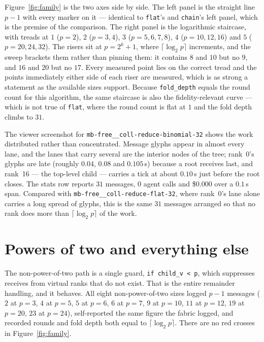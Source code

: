 \documentclass[11pt]{article}
\begin{document}
Figure~\ref{fig:family} is the two axes side by side. The left panel is the straight line $p-1$
with every marker on it --- identical to \texttt{flat}'s and \texttt{chain}'s left panel, which
is the premise of the comparison. The right panel is the logarithmic staircase, with treads at
$1$ ($p=2$), $2$ ($p=3,4$), $3$ ($p=5,6,7,8$), $4$ ($p=10,12,16$) and $5$ ($p=20,24,32$). The
risers sit at $p=2^k+1$, where $\lceil\log_2 p\rceil$ increments, and the sweep brackets them
rather than pinning them: it contains $8$ and $10$ but no $9$, and $16$ and $20$ but no $17$.
Every measured point lies on the correct tread and the points immediately either side of each
riser are measured, which is as strong a statement as the available sizes support. Because
\texttt{fold\_depth} equals the round count for this algorithm, the same staircase is also the
fidelity-relevant curve --- which is not true of \texttt{flat}, where the round count is flat at
$1$ and the fold depth climbs to $31$.

The viewer screenshot for \texttt{mb-free\_\_coll-reduce-binomial-32} shows the work
distributed rather than concentrated. Message glyphs appear in almost every lane, and the lanes
that carry several are the interior nodes of the tree; rank~0's glyphs are late (roughly $0.04$,
$0.08$ and $0.105$\,s) because a root receives last, and rank~16 --- the top-level child ---
carries a tick at about $0.10$\,s just before the root closes. The stats row reports $31$
messages, $0$ agent calls and \$0.000 over a $0.1$\,s span. Compared with
\texttt{mb-free\_\_coll-reduce-flat-32}, where rank~0's lane alone carries a long spread of
glyphs, this is the same $31$ messages arranged so that no rank does more than
$\lceil\log_2 p\rceil$ of the work.

\section{Powers of two and everything else}

The non-power-of-two path is a single guard, \texttt{if child\_v < p}, which suppresses receives
from virtual ranks that do not exist. That is the entire remainder handling, and it behaves. All
eight non-power-of-two sizes logged $p-1$ messages ($2$ at $p=3$, $4$ at $p=5$, $5$ at $p=6$,
$6$ at $p=7$, $9$ at $p=10$, $11$ at $p=12$, $19$ at $p=20$, $23$ at $p=24$), self-reported the
same figure the fabric logged, and recorded rounds and fold depth both equal to
$\lceil\log_2 p\rceil$. There are no red crosses in Figure~\ref{fig:family}.
\end{document}
